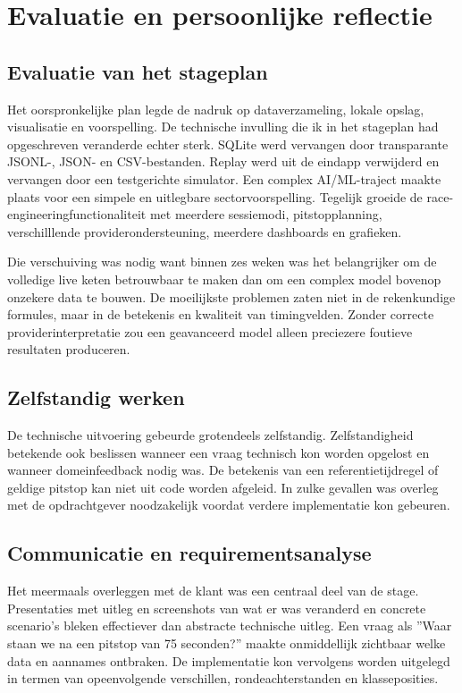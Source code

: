 
\chapter{Evaluatie en persoonlijke reflectie}
\label{chap:reflectie}

\section{Evaluatie van het stageplan}
Het oorspronkelijke plan legde de nadruk op dataverzameling, lokale opslag, visualisatie en
voorspelling. De technische invulling die ik in het stageplan had opgeschreven veranderde echter sterk. SQLite werd vervangen door
transparante JSONL-, JSON- en CSV-bestanden. Replay werd uit de eindapp verwijderd en vervangen door
een testgerichte simulator. Een complex AI/ML-traject maakte plaats voor een simpele en uitlegbare
sectorvoorspelling. Tegelijk groeide de race-engineeringfunctionaliteit met meerdere sessiemodi,
pitstopplanning, verschilllende providerondersteuning, meerdere dashboards en grafieken.

Die verschuiving was nodig want binnen zes weken was het belangrijker om de volledige live keten
betrouwbaar te maken dan om een complex model bovenop onzekere data te bouwen. De moeilijkste
problemen zaten niet in de rekenkundige formules, maar in de betekenis en kwaliteit van
timingvelden. Zonder correcte providerinterpretatie zou een geavanceerd model alleen preciezere
foutieve resultaten produceren.

\section{Zelfstandig werken}
De technische uitvoering gebeurde grotendeels zelfstandig.
Zelfstandigheid betekende ook beslissen wanneer een vraag technisch kon worden opgelost en wanneer
domeinfeedback nodig was. De betekenis van een referentietijdregel of geldige pitstop kan niet uit
code worden afgeleid. In zulke gevallen was overleg met de opdrachtgever noodzakelijk voordat
verdere implementatie kon gebeuren.

\section{Communicatie en requirementsanalyse}
Het meermaals overleggen met de klant was een centraal deel van de stage. Presentaties met uitleg en screenshots van wat er was veranderd en
concrete scenario's bleken effectiever dan abstracte technische uitleg. Een vraag als ''Waar staan
we na een pitstop van 75 seconden?'' maakte onmiddellijk zichtbaar welke data en aannames ontbraken.
De implementatie kon vervolgens worden uitgelegd in termen van opeenvolgende verschillen,
rondeachterstanden en klasseposities.

